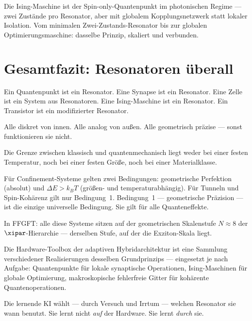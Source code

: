 Die Ising-Maschine ist der Spin-only-Quantenpunkt im photonischen
Regime --- zwei Zustände pro Resonator, aber mit globalem
Kopplungsnetzwerk statt lokaler Isolation.
Vom minimalen Zwei-Zustands-Resonator bis zur globalen
Optimierungsmaschine: dasselbe Prinzip, skaliert und verbunden.

\section{Gesamtfazit: Resonatoren überall}
\label{sec:fazit}

\begin{conclusionBox}[Fazit]
Ein Quantenpunkt ist ein Resonator.
Eine Synapse ist ein Resonator.
Eine Zelle ist ein System aus Resonatoren.
Eine Ising-Maschine ist ein Resonator.
Ein Transistor ist ein modifizierter Resonator.

Alle diskret von innen. Alle analog von außen.
Alle geometrisch präzise --- sonst funktionieren sie nicht.

Die Grenze zwischen klassisch und quantenmechanisch liegt
weder bei einer festen Temperatur, noch bei einer festen Größe,
noch bei einer Materialklasse.

Für Confinement-Systeme gelten zwei Bedingungen:
geometrische Perfektion (absolut) und $\Delta E > k_BT$
(größen- und temperaturabhängig).
Für Tunneln und Spin-Kohärenz gilt nur Bedingung~1.
Bedingung~1 --- geometrische Präzision --- ist die einzige
universelle Bedingung. Sie gilt für alle Quanteneffekte.

In FFGFT: alle diese Systeme sitzen auf der geometrischen
Skalenstufe $N \approx 8$ der $\xipar$-Hierarchie ---
derselben Stufe, auf der die Exziton-Skala liegt.
\end{conclusionBox}

\begin{significance}
Die Hardware-Toolbox der adaptiven Hybridarchitektur
ist eine Sammlung verschiedener Realisierungen desselben
Grundprinzips --- eingesetzt je nach Aufgabe:
Quantenpunkte für lokale synaptische Operationen,
Ising-Maschinen für globale Optimierung,
makroskopische fehlerfreie Gitter für kohärente Quantenoperationen.

Die lernende KI wählt --- durch Versuch und Irrtum ---
welchen Resonator sie wann benutzt.
Sie lernt nicht \textit{auf} der Hardware.
Sie lernt \textit{durch} sie.
\end{significance}

